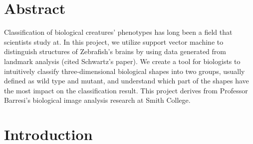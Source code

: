 \documentclass[10pt,letterpaper]{article}
\date{}
\newcommand{\getIndex}[2]{
  \ForEach{,}{\IfEq{#1}{\thislevelitem}{\number\thislevelcount\ExitForEach}{}}{#2}
}
\newcommand{\getAff}[1]{
  \getIndex{#1}{Smith College}
}
\begin{document}
\vspace*{0.2in}

\section*{Abstract}
Classification of biological creatures' phenotypes has long been a field
that scientists study at. In this project, we utilize support vector
machine to distinguish structures of Zebrafish's brains by using data
generated from landmark analysis (cited Schwartz's paper). We create a
tool for biologists to intuitively classify three-dimensional biological
shapes into two groups, usually defined as wild type and mutant, and
understand which part of the shapes have the most impact on the
classification result. This project derives from Professor Barresi's
biological image analysis research at Smith College.


\linenumbers

\newpage

\section{Introduction}\label{introduction}
\end{document}
